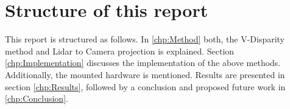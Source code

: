 \section{Structure of this report}
This report is structured as follows. In \ref{chp:Method} both, the V-Disparity method and Lidar to Camera projection is explained. Section \ref{chp:Implementation} discusses the implementation of the above methods. Additionally, the mounted hardware is mentioned.
Results are presented in section \ref{chp:Results}, followed by a conclusion and proposed future work in \ref{chp:Conclusion}.

